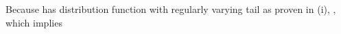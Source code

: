\documentclass{article}
\begin{document}
\begin{Maple Normal}{
\begin{Maple Normal}{
Because
has distribution function
with regularly varying tail as proven in (i),
, which implies}\end{Maple Normal}

}\end{Maple Normal}

\begin{Maple Normal}{
\begin{Maple Normal}{
}
\end{Maple Normal}}
\end{Maple Normal}
\end{document}
